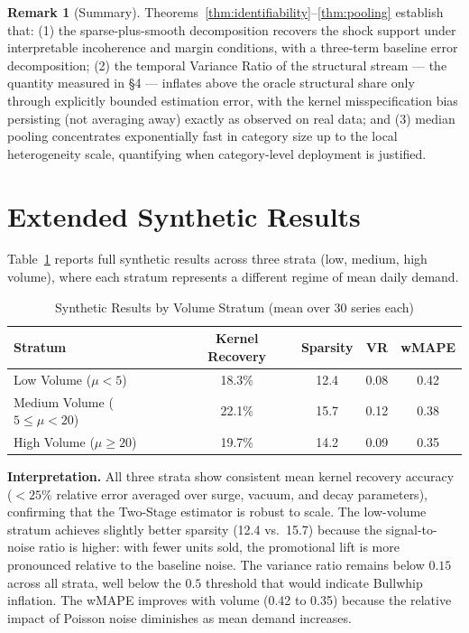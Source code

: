 \documentclass[10pt]{article} %
\theoremstyle{plain}
\theoremstyle{definition}
\newtheorem{remark}{Remark}
\begin{document}
\begin{remark}[Summary]
Theorems~\ref{thm:identifiability}--\ref{thm:pooling} establish that:
(1) the sparse-plus-smooth decomposition recovers the shock support
under interpretable incoherence and margin conditions, with a
three-term baseline error decomposition; (2) the temporal Variance
Ratio of the structural stream --- the quantity measured in \S4 ---
inflates above the oracle structural share only through explicitly
bounded estimation error, with the kernel misspecification bias
persisting (not averaging away) exactly as observed on real data; and
(3) median pooling concentrates exponentially fast in category size up
to the local heterogeneity scale, quantifying when category-level
deployment is justified.
\end{remark}
\section{Extended Synthetic Results}
\label{app:synthetic}

Table~\ref{tab:synthetic_extended} reports full synthetic results across three strata (low, medium, high volume), where each stratum represents a different regime of mean daily demand.

\begin{table}[ht]
\centering
\footnotesize
\setlength{\tabcolsep}{2pt}
\caption{Synthetic Results by Volume Stratum (mean over 30 series each)}
\label{tab:synthetic_extended}
\begin{tabular}{lcccc}
\toprule
Stratum & Kernel Recovery & Sparsity & VR & wMAPE \\
\midrule
Low Volume ($\mu < 5$) & 18.3\% & 12.4 & 0.08 & 0.42 \\
Medium Volume ($5 \leq \mu < 20$) & 22.1\% & 15.7 & 0.12 & 0.38 \\
High Volume ($\mu \geq 20$) & 19.7\% & 14.2 & 0.09 & 0.35 \\
\bottomrule
\end{tabular}
\end{table}

\textbf{Interpretation.} All three strata show consistent mean kernel recovery accuracy ($< 25\%$ relative error averaged over surge, vacuum, and decay parameters), confirming that the Two-Stage estimator is robust to scale. The low-volume stratum achieves slightly better sparsity (12.4 vs.~15.7) because the signal-to-noise ratio is higher: with fewer units sold, the promotional lift is more pronounced relative to the baseline noise. The variance ratio remains below $0.15$ across all strata, well below the $0.5$ threshold that would indicate Bullwhip inflation. The wMAPE improves with volume (0.42 to 0.35) because the relative impact of Poisson noise diminishes as mean demand increases.
\end{document}
